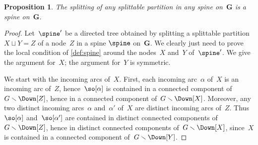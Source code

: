 \documentclass{amsart}
\newtheorem{proposition}[theorem]{Proposition}
\theoremstyle{definition}
\newtheorem{remark}[theorem]{Remark}
\renewcommand{\b}[1]{{\boldsymbol{#1}}} %
\newcommand{\ssm}{\smallsetminus} %
\begin{document}
\begin{proposition}
  \label{prop:nodeSplitting} 
  The splitting of any splittable partition in any spine on~$\b{G}$ is a spine on~$\b{G}$.
\end{proposition}


\begin{proof}
  Let~$\spine'$ be a directed tree obtained by splitting a splittable partition~$X \sqcup Y = Z$ of a node~$Z$ in a spine $\spine$ on~$\b{G}$.
  We clearly just need to prove the local condition of \cref{def:spine} around the nodes~$X$ and~$Y$ of~$\spine'$.
  We give the argument for~$X$; the argument for~$Y$ is symmetric.
  
  We start with the incoming arcs of~$X$.
  First, each incoming arc~$\alpha$ of~$X$ is an incoming arc of~$Z$, hence~$\so[\alpha]$ is contained in a connected component of~$G \ssm \Down[Z]$, hence in a connected component of~$G \ssm \Down[X]$.
  Moreover, any two distinct incoming arcs~$\alpha$ and~$\alpha'$ of~$X$ are distinct incoming arcs of~$Z$. Thus~$\so[\alpha]$ and~$\so[\alpha']$ are contained in distinct connected components of~$G \ssm \Down[Z]$, hence in distinct connected components of~$G \ssm \Down[X]$, since~$X$ is contained in a connected component of~$G \ssm \Down[Y]$.


\end{proof}
\end{document}
